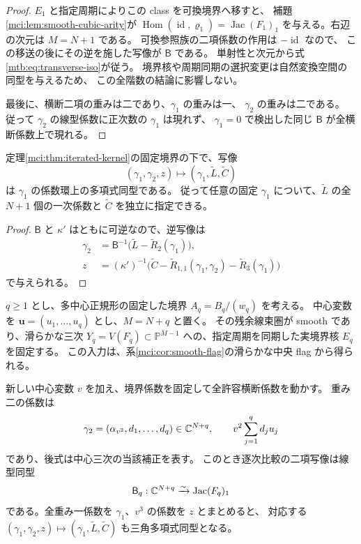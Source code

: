 \begin{proof}
$E_1$ と指定周期によりこの class を可換境界へ移すと、
補題\ref{mci:lem:smooth-cubic-arity}が
$\operatorname{Hom}(\operatorname{id},\varrho_1)=\operatorname{Jac}(F_1)_1$
を与える。右辺の次元は $M=N+1$ である。
可換参照族の二項係数の作用は $-\operatorname{id}$ なので、
この移送の後にその逆を施した写像が $\mathsf B$ である。
単射性と次元から式\eqref{mtb:eq:transverse-iso}が従う。
境界核や周期同期の選択変更は自然変換空間の同型を与えるため、
この全階数の結論に影響しない。

最後に、横断二項の重みは二であり、$\gamma_1$ の重みは一、
$\gamma_2$ の重みは二である。
従って $\gamma_2$ の線型係数に正次数の $\gamma_1$ は現れず、
$\gamma_1=0$ で検出した同じ $\mathsf B$ が全横断係数上で現れる。
\end{proof}

\begin{corollary}[横断係数の三角多項式同型]
\label{mtb:cor:triangular-coefficients}
定理\ref{mci:thm:iterated-kernel}の固定境界の下で、写像
\[
 (\gamma_1,\gamma_2,z)\longmapsto
       (\gamma_1,\widetilde L,\widetilde C)
\]
は $\gamma_1$ の係数環上の多項式同型である。
従って任意の固定 $\gamma_1$ について、$\widetilde L$ の全 $N+1$ 個の一次係数と
$\widetilde C$ を独立に指定できる。
\end{corollary}

\begin{proof}
$\mathsf B$ と $\kappa'$ はともに可逆なので、逆写像は
\[
 \begin{split}
 \gamma_2&=\mathsf B^{-1}
       \bigl(\widetilde L-\widetilde R_2(\gamma_1)\bigr),\\
 z&=(\kappa')^{-1}
       \bigl(\widetilde C-\widetilde R_{1,1}(\gamma_1,\gamma_2)
                         -\widetilde R_3(\gamma_1)\bigr)
 \end{split}
\]
で与えられる。
\end{proof}

\begin{corollary}[任意個の固定中心に対する横断同型]
\label{mtb:cor:many-centers}
$q\ge1$ とし、多中心正規形の固定した境界 $A_q=B_q/(w_q)$ を考える。
中心変数を $\mathbf u=(u_1,\ldots,u_q)$ とし、$M=N+q$ と置く。
その残余線束圏が smooth であり、滑らかな三次
$Y_q=V(F_q)\subset\mathbb P^{M-1}$ への、指定周期を同期した実境界核 $E_q$ を固定する。
この入力は、系\ref{mci:cor:smooth-flag}の滑らかな中央 flag から得られる。

新しい中心変数 $v$ を加え、境界係数を固定して全許容横断係数を動かす。
重み二の係数は
\[
 \gamma_2=(\alpha_{v^2},d_1,\ldots,d_q)\in\mathbb C^{N+q},
 \qquad v^2\sum_{j=1}^q d_j u_j
\]
であり、後式は中心三次の当該補正を表す。
このとき逐次比較の二項写像は線型同型
\[
                 \mathsf B_q:\mathbb C^{N+q}\xrightarrow{\sim}
                                  \operatorname{Jac}(F_q)_1
\]
である。全重み一係数を $\gamma_1$、$v^3$ の係数を $z$ とまとめると、
対応する $(\gamma_1,\gamma_2,z)\mapsto
(\gamma_1,\widetilde L,\widetilde C)$ も三角多項式同型となる。
\end{corollary}

